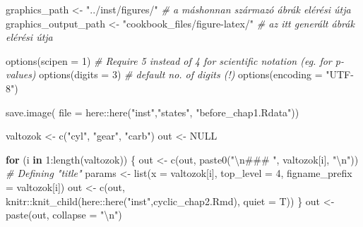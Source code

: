 \documentclass[
]{article}
\newenvironment{Shaded}{\begin{snugshade}}{\end{snugshade}}
\newcommand{\AttributeTok}[1]{\textcolor[rgb]{0.77,0.63,0.00}{#1}}
\newcommand{\CommentTok}[1]{\textcolor[rgb]{0.56,0.35,0.01}{\textit{#1}}}
\newcommand{\ConstantTok}[1]{\textcolor[rgb]{0.00,0.00,0.00}{#1}}
\newcommand{\ControlFlowTok}[1]{\textcolor[rgb]{0.13,0.29,0.53}{\textbf{#1}}}
\newcommand{\DecValTok}[1]{\textcolor[rgb]{0.00,0.00,0.81}{#1}}
\newcommand{\FunctionTok}[1]{\textcolor[rgb]{0.00,0.00,0.00}{#1}}
\newcommand{\NormalTok}[1]{#1}
\newcommand{\OtherTok}[1]{\textcolor[rgb]{0.56,0.35,0.01}{#1}}
\newcommand{\SpecialCharTok}[1]{\textcolor[rgb]{0.00,0.00,0.00}{#1}}
\newcommand{\StringTok}[1]{\textcolor[rgb]{0.31,0.60,0.02}{#1}}
\begin{document}
\begin{Shaded}
\begin{Highlighting}[]
\NormalTok{graphics\_path }\OtherTok{\textless{}{-}} \StringTok{"../inst/figures/"}            \CommentTok{\# a máshonnan származó ábrák elérési útja}
\NormalTok{graphics\_output\_path }\OtherTok{\textless{}{-}} \StringTok{"cookbook\_files/figure{-}latex/"} \CommentTok{\# az itt generált ábrák elérési útja}

\FunctionTok{options}\NormalTok{(}\AttributeTok{scipen =} \DecValTok{1}\NormalTok{) }\CommentTok{\# Require 5 instead of 4 for scientific notation (eg. for p{-}values)}
\FunctionTok{options}\NormalTok{(}\AttributeTok{digits =} \DecValTok{3}\NormalTok{) }\CommentTok{\# default no. of digits (!) }
\FunctionTok{options}\NormalTok{(}\AttributeTok{encoding =} \StringTok{"UTF{-}8"}\NormalTok{) }

\FunctionTok{save.image}\NormalTok{( }\AttributeTok{file =}\NormalTok{ here}\SpecialCharTok{::}\FunctionTok{here}\NormalTok{(}\StringTok{"inst"}\NormalTok{,}\StringTok{"states"}\NormalTok{, }\StringTok{"before\_chap1.Rdata"}\NormalTok{))}

\NormalTok{valtozok }\OtherTok{\textless{}{-}} \FunctionTok{c}\NormalTok{(}\StringTok{"cyl"}\NormalTok{, }\StringTok{"gear"}\NormalTok{, }\StringTok{"carb"}\NormalTok{)}
\NormalTok{out }\OtherTok{\textless{}{-}} \ConstantTok{NULL}

\ControlFlowTok{for}\NormalTok{ (i }\ControlFlowTok{in} \DecValTok{1}\SpecialCharTok{:}\FunctionTok{length}\NormalTok{(valtozok)) \{}
\NormalTok{  out }\OtherTok{\textless{}{-}} \FunctionTok{c}\NormalTok{(out, }\FunctionTok{paste0}\NormalTok{(}\StringTok{"}\SpecialCharTok{\textbackslash{}n}\StringTok{\#\#\# "}\NormalTok{, valtozok[i], }\StringTok{"}\SpecialCharTok{\textbackslash{}n}\StringTok{"}\NormalTok{)) }\CommentTok{\# Defining "title"}
\NormalTok{  params }\OtherTok{\textless{}{-}} \FunctionTok{list}\NormalTok{(}\AttributeTok{x              =}\NormalTok{ valtozok[i],}
                 \AttributeTok{top\_level      =} \DecValTok{4}\NormalTok{,}
                 \AttributeTok{figname\_prefix =}\NormalTok{ valtozok[i])}
\NormalTok{  out }\OtherTok{\textless{}{-}} \FunctionTok{c}\NormalTok{(out,}
\NormalTok{           knitr}\SpecialCharTok{::}\FunctionTok{knit\_child}\NormalTok{(here}\SpecialCharTok{::}\FunctionTok{here}\NormalTok{(}\StringTok{"inst"}\NormalTok{,}\StringTok{\textquotesingle{}cyclic\_chap2.Rmd\textquotesingle{}}\NormalTok{),}
                             \AttributeTok{quiet =}\NormalTok{ T))}
\NormalTok{\}}
\NormalTok{out }\OtherTok{\textless{}{-}} \FunctionTok{paste}\NormalTok{(out, }\AttributeTok{collapse =} \StringTok{"}\SpecialCharTok{\textbackslash{}n}\StringTok{"}\NormalTok{)}


\end{Highlighting}
\end{Shaded}
\end{document}
